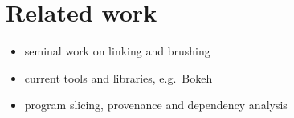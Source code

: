 \section{Related work}
\label{sec:related-work}

\begin{itemize}
  \item seminal work on linking and brushing
  \item current tools and libraries, e.g.~Bokeh
  \item program slicing, provenance and dependency analysis
\end{itemize}
